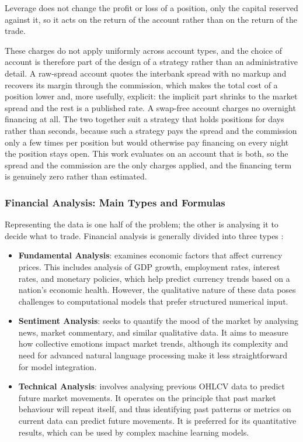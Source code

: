 Leverage does not change the profit or loss of a position, only the capital reserved against it, so it acts on the return of the account rather than on the return of the trade.

These charges do not apply uniformly across account types, and the choice of account is therefore part of the design of a strategy rather than an administrative detail. A raw-spread account quotes the interbank spread with no markup and recovers its margin through the commission, which makes the total cost of a position lower and, more usefully, explicit: the implicit part shrinks to the market spread and the rest is a published rate. A swap-free account charges no overnight financing at all. The two together suit a strategy that holds positions for days rather than seconds, because such a strategy pays the spread and the commission only a few times per position but would otherwise pay financing on every night the position stays open. This work evaluates on an account that is both, so the spread and the commission are the only charges applied, and the financing term is genuinely zero rather than estimated.

\subsubsection{Financial Analysis: Main Types and Formulas}

Representing the data is one half of the problem; the other is analysing it to decide what to trade. Financial analysis is generally divided into three types \cite{lim_handbook_2015}:

\begin{itemize}
\item \textbf{Fundamental Analysis}: examines economic factors that affect currency prices. This includes analysis of GDP growth, employment rates, interest rates, and monetary policies, which help predict currency trends based on a nation's economic health. However, the qualitative nature of these data poses challenges to computational models that prefer structured numerical input.
\item \textbf{Sentiment Analysis}: seeks to quantify the mood of the market by analysing news, market commentary, and similar qualitative data. It aims to measure how collective emotions impact market trends, although its complexity and need for advanced natural language processing make it less straightforward for model integration.
\item \textbf{Technical Analysis}: involves analysing previous OHLCV data to predict future market movements. It operates on the principle that past market behaviour will repeat itself, and thus identifying past patterns or metrics on current data can predict future movements. It is preferred for its quantitative results, which can be used by complex machine learning models.
\end{itemize}


